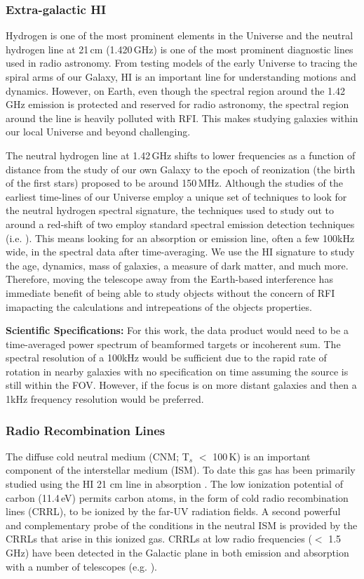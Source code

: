 \subsubsection{Extra-galactic HI}
Hydrogen is one of the most prominent elements in the Universe and the neutral hydrogen line at 21\,cm (1.420\,GHz) is one of the most prominent diagnostic lines used in radio astronomy. From testing models of the early Universe to tracing the spiral arms of our Galaxy, H{\sc I} is an important line for understanding motions and dynamics. However, on Earth, even though the spectral region around the 1.42\,GHz emission is protected and reserved for radio astronomy, the spectral region around the line is heavily polluted with RFI. This makes studying galaxies within our local Universe and beyond challenging. 

The neutral hydrogen line at 1.42\,GHz shifts to lower frequencies as a function of distance from the study of our own Galaxy to the epoch of reonization (the birth of the first stars) proposed to be around 150\,MHz. Although the studies of the earliest time-lines of our Universe employ a unique set of techniques to look for the neutral hydrogen spectral signature, the techniques used to study out to around a red-shift of two employ standard spectral emission detection techniques (i.e. \citealt{WALLABY,FLASH}). This means looking for an absorption or emission line, often a few 100kHz wide, in the spectral data after time-averaging. We use the H{\sc I} signature to study the age, dynamics, mass of galaxies, a measure of dark matter, and much more. Therefore, moving the telescope away from the Earth-based interference has immediate benefit of being able to study objects without the concern of RFI imapacting the calculations and intrepeations of the objects properties.

\textbf{Scientific Specifications:} For this work, the data product would need to be a time-averaged power spectrum of beamformed targets or incoherent sum. The spectral resolution of a 100kHz would be sufficient due to the rapid rate of rotation in nearby galaxies with no specification on time assuming the source is still within the FOV. However, if the focus is on more distant galaxies and then a 1kHz frequency resolution would be preferred. 

\subsubsection{Radio Recombination Lines}
The diffuse cold neutral medium (CNM; T$_{s}$ $<$ 100\,K) is an important component of the interstellar medium (ISM). To date this gas has been primarily studied using the HI 21 cm line in absorption \citep{Dickey_1990}. The low ionization potential of carbon (11.4\,eV) permits carbon atoms, in the form of cold radio recombination lines (CRRL), to be ionized by the far-UV radiation fields. A second powerful and complementary probe of the conditions in the neutral ISM is provided by the CRRLs that arise in this ionized gas. CRRLs at low radio frequencies ($<$ 1.5 GHz) have been detected in the Galactic plane in both emission and absorption with a number of telescopes (e.g. \citealt{Kantharia_2001,Salas_2019}). 


